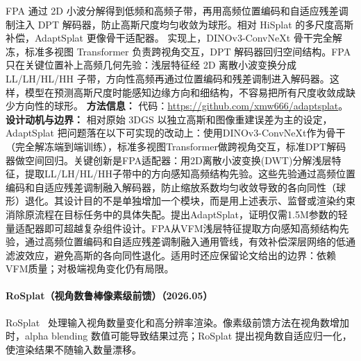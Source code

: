 FPA 通过 2D 小波分解得到低频和高频子带，再用高频位置编码和自适应残差调制注入 DPT 解码器，防止高斯尺度均匀收敛为球形。相对 HiSplat 的多尺度高斯补偿，AdaptSplat 更像骨干适配器。
实现上，DINOv3-ConvNeXt 骨干完全解冻，标准多视图 Transformer 负责跨视角交互，DPT 解码器回归空间结构。FPA 只在关键位置补上高频几何先验：浅层特征经 2D 离散小波变换分成 LL/LH/HL/HH 子带，方向性高频再通过位置编码和残差调制进入解码器。这样，模型在预测高斯尺度时能感知边缘方向和细结构，不容易把所有尺度收敛成缺少方向性的球形。
\textbf{方法信息：} 代码：\url{https://github.com/xmw666/adaptsplat}。
\textbf{设计动机与边界：} 相对原始 3DGS 以独立高斯和图像重建误差为主的设定，AdaptSplat 把问题落在以下可实现的改动上：使用DINOv3-ConvNeXt作为骨干（完全解冻端到端训练），标准多视图Transformer做跨视角交互，标准DPT解码器做空间回归。关键创新是FPA适配器：用2D离散小波变换(DWT)分解浅层特征，提取LL/LH/HL/HH子带中的方向感知高频结构先验。这些先验通过高频位置编码和自适应残差调制融入解码器，防止缩放系数均匀收敛导致的各向同性（球形）退化。其设计目的不是单独增加一个模块，而是用上述表示、监督或渲染约束消除原流程在目标任务中的具体失配。提出AdaptSplat，证明仅需1.5M参数的轻量适配器即可超越复杂组件设计。FPA从VFM浅层特征提取方向感知高频结构先验，通过高频位置编码和自适应残差调制融入通用管线，有效补偿深层网络的低通滤波效应，避免高斯的各向同性退化。适用时还应保留论文给出的边界：依赖VFM质量；对极端视角变化仍有局限。
\paragraph{RoSplat（视角数鲁棒像素级前馈）（2026.05）}
RoSplat~\cite{2605_13093} 处理输入视角数量变化和高分辨率渲染。像素级前馈方法在视角数增加时，alpha blending 数值可能导致结果过亮；RoSplat 提出视角数自适应归一化，使渲染结果不随输入数量漂移。

